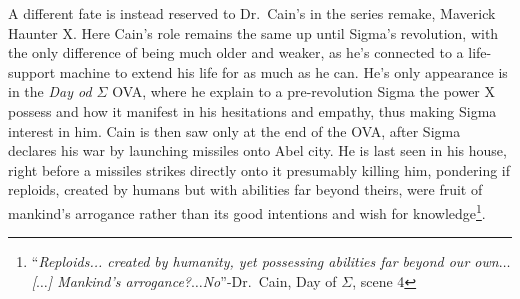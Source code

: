 A different fate is instead reserved to Dr.~Cain's in the series remake, Maverick Haunter X. Here Cain's role remains the same up until Sigma's revolution, with the only difference of being much older and weaker, as he's connected to a life-support machine to extend his life for as much as he can. He's only appearance is in the \emph{Day od $\Sigma$} OVA, where he explain to a pre-revolution Sigma the power X possess and how it manifest in his hesitations and empathy, thus making Sigma interest in him. Cain is then saw only at the end of the OVA, after Sigma declares his war by launching missiles onto Abel city. He is last seen in his house, right before a missiles strikes directly onto it presumably killing him, pondering if reploids, created by humans but with abilities far beyond theirs, were fruit of mankind's arrogance rather than its good intentions and wish for knowledge\footnote{``\textit{Reploids... created by humanity, yet possessing abilities far beyond our own$\dots$ [$\dots$] Mankind's arrogance?$\dots$No}''-Dr.~Cain, Day of $\Sigma$, scene 4}.

